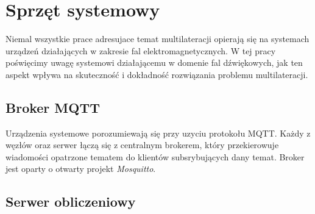 \chapter{Sprzęt systemowy}\label{chap:hardware}

Niemal wszystkie prace adresujace temat multilateracji opierają się na systemach urządzeń działających w zakresie fal elektromagnetycznych. W tej pracy poświęcimy uwagę systemowi działającemu w domenie fal dźwiękowych, jak ten aspekt wpływa na skuteczność i dokładność rozwiązania problemu multilateracji.

\begin{center}
\end{center}

\section{Broker MQTT}

Urządzenia systemowe porozumiewają się przy uzyciu protokołu MQTT. Każdy z węzłów oraz serwer łączą się z centralnym brokerem, który przekierowuje wiadomości opatrzone tematem do klientów subsrybujących dany temat. Broker jest oparty o otwarty projekt \textit{Mosquitto}.

\section{Serwer obliczeniowy}

